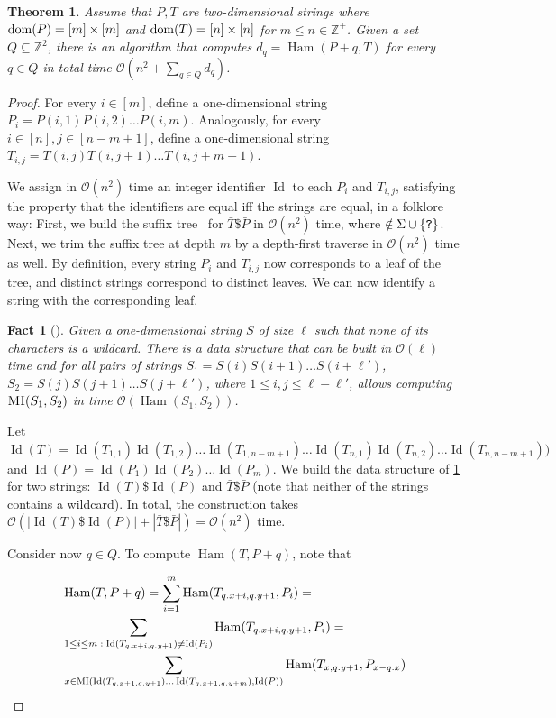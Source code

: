 \documentclass[11pt, letterpaper]{article}
\theoremstyle{plain}
\newtheorem{theorem}{Theorem}
\newtheorem{fact}{Fact}
\theoremstyle{definition}
\theoremstyle{remark}
\newcommand{\Z}{\mathbb{Z}}
\renewcommand{\O}{\mathcal{O}}
\DeclareMathOperator*{\Ham}{Ham}
\DeclareMathOperator*{\ID}{Id}
\begin{document}
\begin{theorem}\label{kangaroos}
Assume that $P, T$ are two-dimensional strings where $\operatorname*{dom}(P) = [m] \times [m]$ and $\operatorname*{dom}(T) = [n] \times [n]$ for $m \le n \in \Z^+$. Given a set $Q \subseteq \Z^2$, there is an algorithm that computes $d_q = \Ham(P + q, T) $ for every $q \in Q$ in total time $\O(n^2 + \sum_{q \in Q} d_q)$.
\end{theorem}
\begin{proof}
For every $i \in [m]$, define a one-dimensional string $P_i = P(i,1) P(i,2) \ldots P(i,m)$. Analogously, for every $i \in [n], j \in [n-m+1]$, define a one-dimensional string $T_{i,j} = T(i,j) T(i,j+1) \ldots T(i,j+m-1)$. 

We assign in $\O(n^2)$ time an integer identifier $\ID$ to each $P_i$ and $T_{i,j}$, satisfying the property that the identifiers are equal iff the strings are equal, in a folklore way: First, we build the suffix tree~\cite{DBLP:conf/focs/Weiner73} for $\bar{T} \$ \bar{P}$ in $\O(n^2)$ time, where $ \notin \Sigma \cup \{\texttt{?}\}$. Next, we trim the suffix tree at depth $m$ by a depth-first traverse in $\O(n^2)$ time as well. By definition, every string $P_i$ and $T_{i,j}$ now corresponds to a leaf of the tree, and distinct strings correspond to distinct leaves. We can now identify a string with the corresponding leaf. 

\begin{fact}[{\cite{Galil1986}}]\label{fact:kangaroo1D}
Given a one-dimensional string $S$ of size $\ell$ such that none of its characters is a wildcard. There is a data structure that can be built in $\O(\ell)$ time and for all pairs of strings $S_1 = S(i) S(i+1) \ldots S(i+\ell')$, $S_2 = S(j) S(j+1) \ldots S(j+\ell')$, where $1 \le i,j \le \ell-\ell'$, allows computing $\textsc{MI}(S_1, S_2)$ in time $\O(\Ham(S_1,S_2))$. 
\end{fact}

Let $\ID(T) = \ID(T_{1,1}) \ID(T_{1,2}) \ldots \ID(T_{1,n-m+1}) \ldots \ID(T_{n,1}) \ID(T_{n,2}) \ldots \ID(T_{n,n-m+1}))$ and $\ID(P) = \ID(P_1)\ID(P_2) \ldots \ID(P_m)$. 
We build the data structure of \cref{fact:kangaroo1D} for two strings: $\ID(T) \$ \ID(P)$ and $\bar{T} \$ \bar{P}$ (note that neither of the strings contains a wildcard). In total, the construction takes $\O(|\ID(T) \$ \ID(P)| + |\bar{T} \$ \bar{P}|) = \O(n^2)$ time.

Consider now $q \in Q$. To compute $\Ham(T, P+q)$, note that 

\begin{align*}
&\Ham(T, P+q) = \sum_{i=1}^m \Ham(T_{\x{q}+i, \y{q}+1}, P_i)=\\
&\sum_{1 \le i \le m \; : \; \ID(T_{\x{q}+i, \y{q}+1}) \neq \ID(P_i)} \Ham(T_{\x{q}+i, \y{q}+1}, P_i) = \\
&\sum_{x \in \MI(\ID(T_{\x{q}+1, \y{q}+1}) \ldots \ID(T_{\x{q}+1, \y{q}+m}), \ID(P))} \Ham(T_{x, \y{q}+1}, P_{x-\x{q}})\\
\end{align*}


\end{proof}
\end{document}
